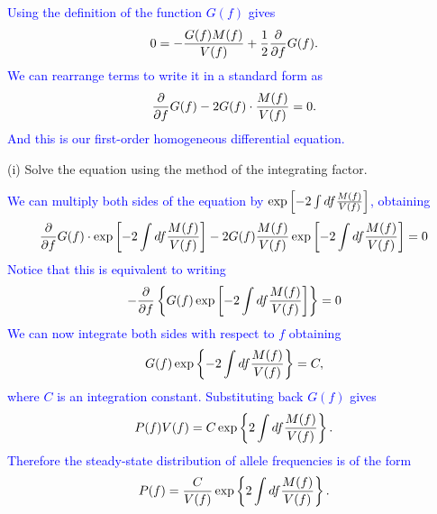 \documentclass[12pt]{article}    %
\newcommand{\dd}[1]{{\partial \over \partial {#1}}}
\begin{document}
\textcolor{blue}{
Using the definition of the function $G(f)$ gives
\begin{equation}
  0 = - {G(f) M(f) \over V(f)} + {1 \over 2} \dd{f}G(f).
\end{equation}
We can rearrange terms to write it in a standard form as
\begin{equation}
  \dd{f}G(f) - 2 G(f)\cdot {M(f) \over V(f)} = 0.
\end{equation}
And this is our first-order homogeneous differential equation.
}

\noindent
(i) Solve the equation using the method of the integrating factor.

\textcolor{blue}{
We can multiply both sides of the equation by $\exp \left[
-2 \int df {M(f) \over V(f)} \right]$, obtaining
\begin{equation}
  \dd{f}G(f) \cdot \exp\left[ -2 \int df {M(f) \over V(f)} \right] -
  2 G(f) {M(f) \over V(f)} \exp\left[ -2 \int df {M(f) \over V(f)} \right] = 0
\end{equation}
Notice that this is equivalent to writing
\begin{equation}
- \dd{f} \left\{ G(f) \exp \left[ -2 \int df {M(f)\over V(f)} \right] \right\}
= 0
\end{equation}
We can now integrate both sides with respect to $f$ obtaining
\begin{equation}
  G(f) \exp\left\{ -2 \int df {M(f) \over V(f)} \right\} = C,
\end{equation}
where $C$ is an integration constant. Substituting back $G(f)$ gives
\begin{equation}
  P(f)V(f) = C \exp\left\{ 2 \int df {M(f) \over V(f)} \right\}.
\end{equation}
Therefore the steady-state distribution of allele frequencies is of the form
\begin{equation}
  P(f) = {C \over V(f)} \exp\left\{ 2 \int df {M(f) \over V(f)} \right\}.
\end{equation}
}
\end{document}
